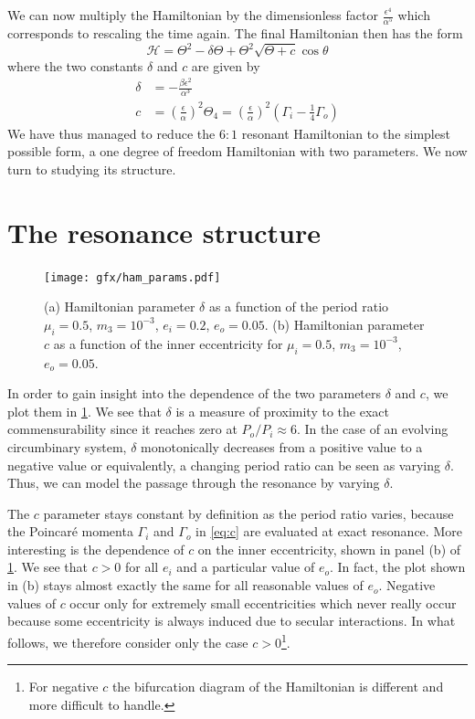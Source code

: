 \documentclass[twoside,openright,titlepage,numbers=noenddot,headinclude,%
                footinclude=true,cleardoublepage=empty,abstractoff, 
                BCOR=5mm,paper=a4,fontsize=11pt,%
                american,%
                ]{scrreprt}%
\begin{document}
We can now multiply the Hamiltonian by the dimensionless factor 
$\frac{\epsilon^4}{\alpha^5}$ which corresponds to rescaling the time
again. The final Hamiltonian then has the form
\begin{equation}
    \mathcal{H}= \Theta^2-\delta\Theta +
     \Theta^2\sqrt{\Theta+ c}
    \cos\theta
    \label{eq:hamiltonian_final}
\end{equation}
where the two constants $\delta$ and $c$ are given by
\begin{align}
    \delta&= -\frac{\beta\epsilon^2}{\alpha^3}\label{eq:delta}\\
    c&= \left( \frac{\epsilon}{\alpha} \right)^2 \Theta_4
    =\left( \frac{\epsilon}{\alpha} \right)^2\left(\Gamma_i- \frac{1}{4}
    \Gamma_o\right)\label{eq:c}
\end{align}
We have thus managed to reduce the $6:1$ resonant Hamiltonian to the
simplest possible form, a one degree of freedom Hamiltonian with two
parameters. We now turn to studying its structure.
\section{The resonance structure}
\label{sec:The resonance structure}
\begin{figure}[htb]
\centering
    \texttt{[image: gfx/ham\_params.pdf]}
    \caption[Parameters of the Hamiltonian.]{(a) Hamiltonian parameter $\delta$
     as a function of the period ratio $\mu_i=0.5$, $m_3=10^{-3}$, 
     $e_i=0.2$, $e_o=0.05$.
     (b) Hamiltonian parameter $c$ as a function of the inner
     eccentricity for $\mu_i=0.5$, $m_3=10^{-3}$, $e_o=0.05$.}
\label{fig:ham_params}
\end{figure}
In order to gain insight into the dependence of the two parameters $\delta$
and $c$, we plot them in \cref{fig:ham_params}. We see that $\delta$ is a 
measure of proximity to the exact commensurability since it reaches 
zero at $P_o/P_i\approx 6$. In the case of an evolving circumbinary 
system, $\delta$ monotonically decreases from a positive value to a negative
value or equivalently, a changing period ratio can be seen as varying
$\delta$. Thus, we can model the passage through the resonance by varying 
$\delta$.  

The $c$ parameter stays constant by definition as the period ratio varies,
because the Poincaré momenta $\Gamma_i$ and $\Gamma_o$ in \cref{eq:c}
are evaluated at exact resonance. More interesting is the dependence
of $c$ on the inner eccentricity, shown in panel (b) of \cref{fig:ham_params}.
We see that $c>0$ for all $e_i$ and a particular value of $e_o$. In fact, the
plot shown in (b) stays almost exactly the same for all reasonable values
of $e_o$. Negative values of $c$ occur only for extremely small eccentricities
which never really occur because some eccentricity is always induced due to 
secular interactions. In what follows, we therefore consider only the case
$c>0$\footnote{For negative $c$ the bifurcation diagram of the Hamiltonian is
different and more difficult to handle.}.
\end{document}
